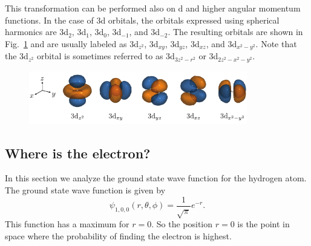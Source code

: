 \documentclass[../Main/chem331-notes.tex]{subfiles}
\begin{document}
This transformation can be performed also on d and higher angular momentum functions. In the case of 3d orbitals, the orbitals expressed using spherical harmonics are 3d$_{2}$, 3d$_{1}$, 3d$_{0}$, 3d$_{-1}$, and 3d$_{-2}$.
The resulting orbitals are shown in Fig.~\ref{fig:hydrogenatom:dorbitals} and are usually labeled as 3d$_{z^2}$, 3d$_{xy}$, 3d$_{yz}$, 3d$_{xz}$, and 3d$_{x^2-y^2}$.
Note that the 3d$_{z^2}$ orbital is sometimes referred to as 3d$_{3z^2 - r^2}$ or 3d$_{2z^2 - x^2 - y^2}$.
\begin{figure}[b!]
   \centering
\includegraphics[width=3.75in]{../Figures/HydrogenAtom/DOrbitals.pdf}
\label{fig:hydrogenatom:dorbitals}
\end{figure}



\subsection{Where is the electron?}
In this section we analyze the ground state wave function for the hydrogen atom.
The ground state wave function is given by
\begin{equation}
\psi_{1,0,0}(r,\theta,\phi) = \frac{1}{\sqrt{\pi}} e^{-r}.
\end{equation}
This function has a maximum for $r = 0$. So the position $r = 0$ is the point in space where the probability of finding the electron is highest.

\end{document}
